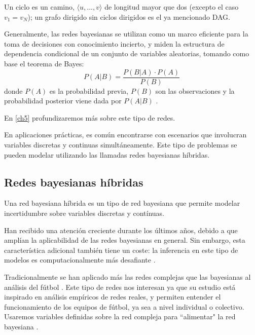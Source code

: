 Un ciclo es un camino, $\langle u,...,v \rangle$ de longitud mayor que dos 
(excepto el caso $v_{1} = v_{N}$); un grafo 
dirigido sin ciclos dirigidos es el ya mencionado DAG. 

Generalmente, las redes bayesianas se utilizan como un marco eficiente para la
toma de decisiones con conocimiento incierto, y miden la estructura de dependencia condicional
de un conjunto de variables aleatorias, tomando como base el teorema de Bayes:\\
\begin{equation} \label{eq:bayes}
P(A|B) = \frac{P(B|A) \cdot P(A)}{P(B)}
\end{equation}
donde $P(A)$ es la probabilidad previa, $P(B)$ son las observaciones y la probabilidad posterior viene dada 
por $P(A|B)$ \cite{YANG201919}.

En \ref{ch5} profundizaremos más sobre este tipo de redes.

En aplicaciones prácticas, es común encontrarse con escenarios que
involucran variables discretas y continuas simultáneamente. Este tipo de problemas se pueden modelar 
utilizando las llamadas redes bayesianas híbridas.

\subsection{Redes bayesianas híbridas}
\begin{definicion} \label{def:hybrid_BN}
    Una red bayesiana híbrida \cite{hybrid-BN} es un tipo de red bayesiana que permite modelar incertidumbre
    sobre variables discretas y contínuas.
\end{definicion}

Han recibido una atención creciente durante 
los últimos años, debido a que amplían la aplicabilidad de las redes bayesianas en general. Sin embargo, 
esta característica adicional también tiene un coste: la inferencia
en este tipo de modelos es computacionalmente más desafiante \cite{inference-rev-hbn}.

Tradicionalmente se han aplicado más las redes complejas que las bayesianas al análisis del fútbol \cite{ARRIAZAARDILES2018236}.
Este tipo de redes nos interesan ya que su estudio está inspirado en análisis empíricos de redes reales, y 
permiten entender el funcionamiento de los equipos de fútbol, ya sea a nivel individual o colectivo. Usaremos 
variables definidas sobre la red compleja para ``alimentar" la red bayesiana \cite{Bai_Xing_Wu_2022}.

